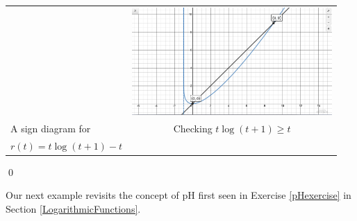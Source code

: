 \begin{ex}
\begin{enumerate}
\begin{center}
\begin{tabular}{m{2in}c}
& 


\includegraphics[width=3in]{./LogarithmicEquationsandInequalitiesGraphics/LogEqnEx09.jpg} \\

A sign diagram for   
&

Checking $t \log(t+1) \geq t$ \\

$r(t) = t \log(t+1)  - t $ & \\


\end{tabular}

\end{center}

\qed
\end{enumerate}
\end{ex}

\smallskip

Our next example revisits the concept of pH first seen in Exercise \ref{pHexercise} in Section \ref{LogarithmicFunctions}.  


